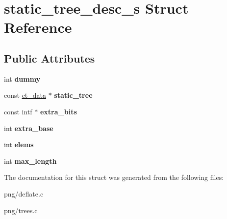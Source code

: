 \hypertarget{structstatic__tree__desc__s}{}\section{static\+\_\+tree\+\_\+desc\+\_\+s Struct Reference}
\label{structstatic__tree__desc__s}
\subsection*{Public Attributes}
\begin{DoxyCompactItemize}
\item 
int {\bfseries dummy}\hypertarget{structstatic__tree__desc__s_aa3662e0ed40c86de246851a7a2483308}{}\label{structstatic__tree__desc__s_aa3662e0ed40c86de246851a7a2483308}

\item 
const \hyperlink{structct__data__s}{ct\+\_\+data} $\ast$ {\bfseries static\+\_\+tree}\hypertarget{structstatic__tree__desc__s_a56265073858de4ffe99e32d0f9d38545}{}\label{structstatic__tree__desc__s_a56265073858de4ffe99e32d0f9d38545}

\item 
const intf $\ast$ {\bfseries extra\+\_\+bits}\hypertarget{structstatic__tree__desc__s_a4ec9abd624cbf2bfcc48dfb786925986}{}\label{structstatic__tree__desc__s_a4ec9abd624cbf2bfcc48dfb786925986}

\item 
int {\bfseries extra\+\_\+base}\hypertarget{structstatic__tree__desc__s_a1051cc83d9d410ccf21427df9bd85201}{}\label{structstatic__tree__desc__s_a1051cc83d9d410ccf21427df9bd85201}

\item 
int {\bfseries elems}\hypertarget{structstatic__tree__desc__s_ab4bad1c091188c43413a09f626a5787f}{}\label{structstatic__tree__desc__s_ab4bad1c091188c43413a09f626a5787f}

\item 
int {\bfseries max\+\_\+length}\hypertarget{structstatic__tree__desc__s_ae767848725194f63fa9cf08142767ad4}{}\label{structstatic__tree__desc__s_ae767848725194f63fa9cf08142767ad4}

\end{DoxyCompactItemize}


The documentation for this struct was generated from the following files\+:\begin{DoxyCompactItemize}
\item 
png/deflate.\+c\item 
png/trees.\+c\end{DoxyCompactItemize}
